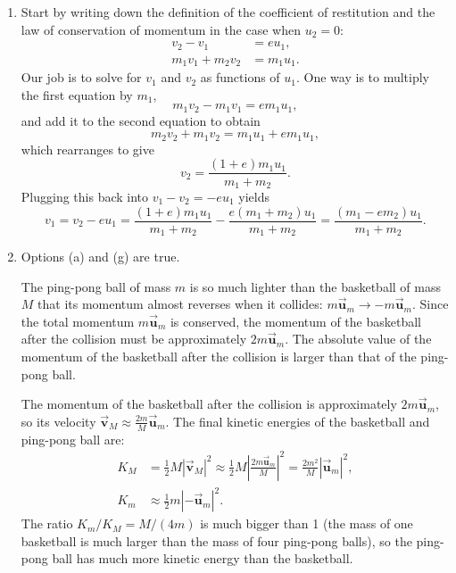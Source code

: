 \documentclass[12pt]{article}
\begin{document}
\begin{enumerate}
\item Start by writing down the definition of the coefficient of
  restitution and the law of conservation of momentum in the case when
  $u_2 = 0$:
  \begin{align*}
    v_2 - v_1 &= eu_1 ,\\
    m_1 v_1 + m_2 v_2 &= m_1 u_1 .
  \end{align*}
  Our job is to solve for $v_1$ and $v_2$ as functions of $u_1$. One way
  is to multiply the first equation by $m_1$,
  \begin{displaymath}
    m_1 v_2 - m_1 v_1 = e m_1 u_1,
  \end{displaymath}
  and add it to the second equation to obtain
  \begin{displaymath}
    m_2 v_2 + m_1 v_2 = m_1 u_1 + e m_1 u_1 ,
  \end{displaymath}
  which rearranges to give
  \begin{displaymath}
    v_2 = \frac{(1 + e)m_1 u_1}{m_1 + m_2}.
  \end{displaymath}
  Plugging this back into $v_1 - v_2 = -eu_1$ yields
  \begin{displaymath}
    v_1 = v_2 - eu_1 = \frac{(1+e)m_1 u_1}{m_1 + m_2} - \frac{e(m_1 +
    m_2)u_1}{m_1 + m_2} = \frac{(m_1 - e m_2)u_1}{m_1 + m_2}.
  \end{displaymath}


\item Options (a) and (g) are true.

  The ping-pong ball of mass $m$ is so much lighter than the basketball
  of mass $M$ that its momentum almost reverses when it collides:
  $m\vec{\boldsymbol{u}}_m \rightarrow -m\vec{\boldsymbol{u}}_m$. Since the total momentum $m\vec{\boldsymbol{u}}_m$ is
  conserved, the momentum of the basketball after the collision must be
  approximately $2m\vec{\boldsymbol{u}}_m$. The absolute value of the momentum of the
  basketball after the collision is larger than that of the ping-pong
  ball.

  The momentum of the basketball after the collision is approximately
  $2m\vec{\boldsymbol{u}}_m$, so its velocity $\vec{\boldsymbol{v}}_M \approx \frac{2m}{M} \vec{\boldsymbol{u}}_m$. The
  final kinetic energies of the basketball and ping-pong ball are:
  \begin{align*}
    K_M
    &= \frac{1}{2}M |\vec{\boldsymbol{v}}_M|^2 \approx \frac{1}{2} M
      \left |\frac{2m\vec{\boldsymbol{u}}_m}{M}\right |^2 = \frac{2m^2}{M}
      |\vec{\boldsymbol{u}}_m|^2 ,\\
    K_m
    &\approx \frac{1}{2} m |-\vec{\boldsymbol{u}}_m|^2 .
  \end{align*}
  The ratio $K_m/K_M = M/(4m)$ is much bigger than 1 (the mass of one
  basketball is much larger than the mass of four ping-pong balls), so
  the ping-pong ball has much more kinetic energy than the basketball.


\end{enumerate}
\end{document}
